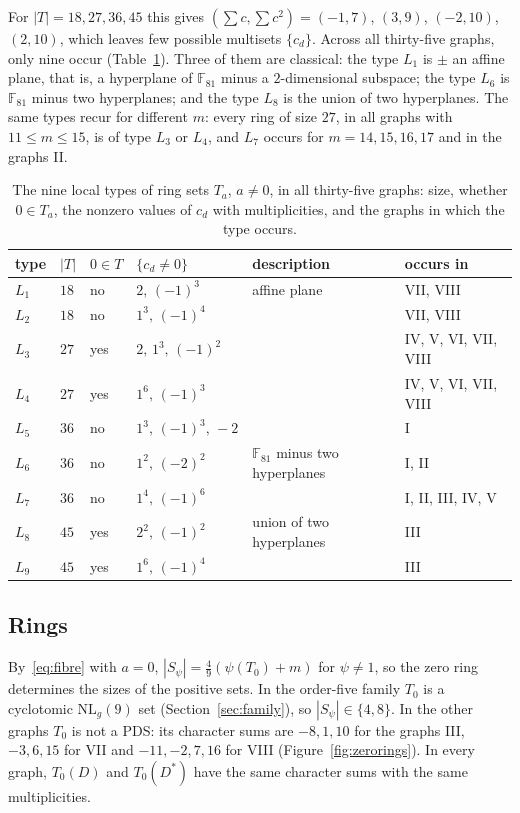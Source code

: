 \documentclass[11pt]{amsart}
\theoremstyle{definition}
\newcommand{\F}{\mathbb{F}}
\newcommand{\NL}{\mathrm{NL}}
\begin{document}
For $|T|=18,27,36,45$ this gives $(\sum c,\sum c^2)=(-1,7)$, $(3,9)$, $(-2,10)$, $(2,10)$, which leaves few possible multisets $\{c_d\}$. Across all thirty-five graphs, only nine occur (Table~\ref{tab:alphabet}). Three of them are classical: the type $L_1$ is $\pm$ an affine plane, that is, a hyperplane of $\F_{81}$ minus a $2$-dimensional subspace; the type $L_6$ is $\F_{81}$ minus two hyperplanes; and the type $L_8$ is the union of two hyperplanes. The same types recur for different $m$: every ring of size $27$, in all graphs with $11\le m\le15$, is of type $L_3$ or $L_4$, and $L_7$ occurs for $m=14,15,16,17$ and in the graphs II.

\begin{table}[ht]
\centering\small
\caption{The nine local types of ring sets $T_a$, $a\ne0$, in all thirty-five graphs: size, whether $0\in T_a$, the nonzero values of $c_d$ with multiplicities, and the graphs in which the type occurs.}\label{tab:alphabet}
\begin{tabular}{llllll}
\toprule
type & $|T|$ & $0\in T$ & $\{c_d\ne0\}$ & description & occurs in\\
\midrule
$L_1$ & $18$ & no & $2,\,(-1)^3$ & affine plane & VII, VIII\\
$L_2$ & $18$ & no & $1^3,\,(-1)^4$ & & VII, VIII\\
$L_3$ & $27$ & yes & $2,\,1^3,\,(-1)^2$ & & IV, V, VI, VII, VIII\\
$L_4$ & $27$ & yes & $1^6,\,(-1)^3$ & & IV, V, VI, VII, VIII\\
$L_5$ & $36$ & no & $1^3,\,(-1)^3,\,-2$ & & I\\
$L_6$ & $36$ & no & $1^2,\,(-2)^2$ & $\F_{81}$ minus two hyperplanes & I, II\\
$L_7$ & $36$ & no & $1^4,\,(-1)^6$ & & I, II, III, IV, V\\
$L_8$ & $45$ & yes & $2^2,\,(-1)^2$ & union of two hyperplanes & III\\
$L_9$ & $45$ & yes & $1^6,\,(-1)^4$ & & III\\
\bottomrule
\end{tabular}
\end{table}

\subsection{Rings}
By~\eqref{eq:fibre} with $a=0$, $|S_\psi|=\tfrac49(\psi(T_0)+m)$ for $\psi\ne1$, so the zero ring determines the sizes of the positive sets. In the order-five family $T_0$ is a cyclotomic $\NL_g(9)$ set (Section~\ref{sec:family}), so $|S_\psi|\in\{4,8\}$. In the other graphs $T_0$ is not a PDS: its character sums are $-8,1,10$ for the graphs III, $-3,6,15$ for VII and $-11,-2,7,16$ for VIII (Figure~\ref{fig:zerorings}). In every graph, $T_0(D)$ and $T_0(D^*)$ have the same character sums with the same multiplicities.
\end{document}
